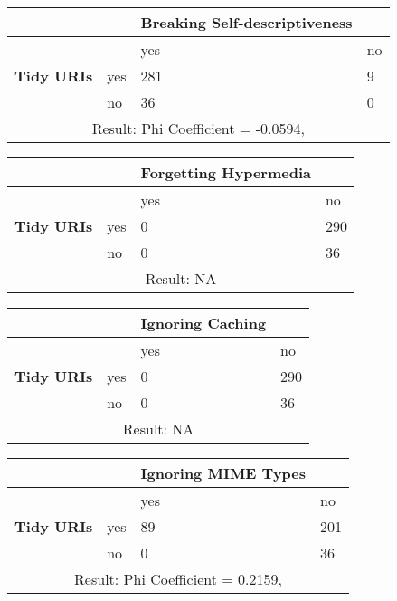 \documentclass[a4paper,12pt]{article}
\begin{document}
\begin{center}
  \begin{tabular}{| p{60mm} | p{10mm} | p{35mm} | p{35mm} |}
  \hline
   & & \textbf{Breaking Self-descriptiveness} &
  \\
  \hline
  & & yes & no
  \\
  \hline
  \textbf{Tidy URIs} & yes & 281 & 9
  \\
  \hline
   & no & 36 & 0
  \\
  \hline
  \multicolumn{4}{|c|}{Result: Phi Coefficient = -0.0594, }
  \\ \hline
  \end{tabular}
  \end{center}

\begin{center}
  \begin{tabular}{| p{60mm} | p{10mm} | p{35mm} | p{35mm} |}
  \hline
   & & \textbf{Forgetting Hypermedia} &
  \\
  \hline
  & & yes & no
  \\
  \hline
  \textbf{Tidy URIs} & yes & 0 & 290
  \\
  \hline
   & no & 0 & 36
  \\
  \hline
  \multicolumn{4}{|c|}{Result: NA}
  \\ \hline
  \end{tabular}
  \end{center}

\begin{center}
  \begin{tabular}{| p{60mm} | p{10mm} | p{35mm} | p{35mm} |}
  \hline
   & & \textbf{Ignoring Caching} &
  \\
  \hline
  & & yes & no
  \\
  \hline
  \textbf{Tidy URIs} & yes & 0 & 290
  \\
  \hline
   & no & 0 & 36
  \\
  \hline
  \multicolumn{4}{|c|}{Result: NA}
  \\ \hline
  \end{tabular}
  \end{center}

\begin{center}
  \begin{tabular}{| p{60mm} | p{10mm} | p{35mm} | p{35mm} |}
  \hline
   & & \textbf{Ignoring MIME Types} &
  \\
  \hline
  & & yes & no
  \\
  \hline
  \textbf{Tidy URIs} & yes & 89 & 201
  \\
  \hline
   & no & 0 & 36
  \\
  \hline
  \multicolumn{4}{|c|}{Result: Phi Coefficient = 0.2159, }
  \\ \hline
  \end{tabular}
  \end{center}
\end{document}
